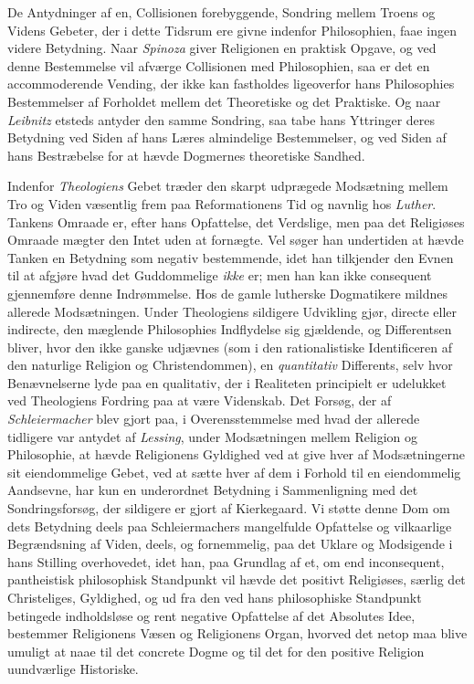 \documentclass[12pt,a4paper]{book}
\newcommand{\opage}[1]{\marginnote{\footnotesize\textit{[#1]}}}
\begin{document}
De Antydninger af en, Collisionen forebyggende, Sondring mellem Troens og Videns
Gebeter, der i dette Tidsrum ere givne indenfor Philosophien, faae ingen videre
Betydning. Naar \emph{Spinoza} giver Religionen en praktisk Opgave, og ved denne
Bestemmelse vil afværge Collisionen med Philosophien, saa er det en accommoderende
Vending, der ikke kan fastholdes ligeoverfor hans Philosophies Bestemmelser af
Forholdet mellem det Theoretiske og det Praktiske. Og naar \emph{Leibnitz} etsteds
antyder den samme Sondring, saa tabe hans Yttringer deres Betydning ved Siden af
hans Læres almindelige Bestemmelser, og ved Siden af hans Bestræbelse for at
hævde Dogmernes theoretiske Sandhed.

Indenfor \emph{Theologiens} Gebet træder den skarpt udprægede Modsætning mellem Tro og
Viden væsentlig frem paa Reformationens Tid og navnlig hos \emph{Luther}. Tankens
Omraade er, efter hans Opfattelse, det Verdslige, men paa det Religiøses Omraade
mægter den Intet uden at fornægte. Vel søger han undertiden at hævde Tanken en
Be\opage{25}tydning som negativ bestemmende, idet han tilkjender den Evnen til at afgjøre
hvad det Guddommelige \emph{ikke} er; men han kan ikke consequent gjennemføre denne
Indrømmelse. Hos de gamle lutherske Dogmatikere mildnes allerede Modsætningen.
Under Theologiens sildigere Udvikling gjør, directe eller indirecte, den mæglende
Philosophies Indflydelse sig gjældende, og Differentsen bliver, hvor den ikke
ganske udjævnes (som i den rationalistiske Identificeren af den naturlige Religion
og Christendommen), en \emph{quantitativ} Differents, selv hvor Benævnelserne lyde paa en
qualitativ, der i Realiteten principielt er udelukket ved Theologiens Fordring paa
at være Videnskab. Det Forsøg, der af \emph{Schleiermacher} blev gjort paa, i
Overensstemmelse med hvad der allerede tidligere var antydet af \emph{Lessing}, under
Modsætningen mellem Religion og Philosophie, at hævde Religionens Gyldighed ved at
give hver af Modsætningerne sit eiendommelige Gebet, ved at sætte hver af dem i
Forhold til en eiendommelig Aandsevne, har kun en underordnet Betydning i
Sammenligning med det Sondringsforsøg, der sildigere er gjort af Kierkegaard. Vi
støtte denne Dom om dets Betydning deels paa Schleiermachers mangelfulde
Opfattelse og vilkaarlige Begrændsning af Viden, deels, og fornemmelig, paa det
Uklare og Modsigende i hans Stilling overhovedet, idet han, paa Grundlag af et, om
end inconsequent, pantheistisk philosophisk Standpunkt vil hævde det positivt
Religiøses, særlig det Christeliges, Gyldighed, og ud fra den ved hans
philosophiske Standpunkt betingede indholdsløse og rent negative Opfattelse af det
Absolutes Idee, bestemmer Religionens Væsen og Religionens Organ, hvorved det
netop maa blive umuligt at naae til det concrete Dogme og til det for den positive
Religion uundværlige Historiske.
\end{document}
